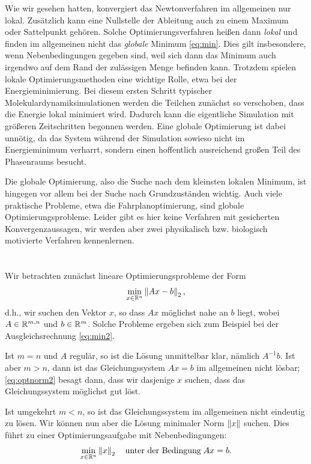 Wie wir gesehen hatten, konvergiert das Newtonverfahren im allgemeinen
nur lokal. Zusätzlich kann eine Nullstelle der Ableitung auch zu einem
Maximum oder Sattelpunkt gehören. Solche Optimierungsverfahren heißen
dann \emph{lokal} und finden im allgemeinen
nicht das \emph{globale} Minimum \eqref{eq:min}. Dies gilt
insbesondere, wenn Nebenbedingungen gegeben sind, weil sich dann das
Minimum auch irgendwo auf dem Rand der zulässigen Menge befinden
kann. Trotzdem spielen lokale Optimierungsmethoden eine wichtige
Rolle, etwa bei der Energieminimierung. Bei diesem ersten Schritt
typischer Molekulardynamiksimulationen werden die Teilchen zunächst so
verschoben, dass die Energie lokal minimiert wird. Dadurch kann die
eigentliche Simulation mit größeren Zeitschritten begonnen
werden. Eine globale Optimierung ist dabei unnötig, da das System
während der Simulation sowieso nicht im Energieminimum verharrt,
sondern einen hoffentlich ausreichend großen Teil des Phasenraums
besucht.

Die globale Optimierung, also die Suche
nach dem kleinsten lokalen Minimum, ist hingegen vor allem bei der
Suche nach Grundzuständen wichtig. Auch viele praktische Probleme,
etwa die Fahrplanoptimierung, sind globale
Optimierungsprobleme. Leider gibt es hier keine Verfahren mit
gesicherten Konvergenzaussagen, wir werden aber zwei physikalisch
bzw. biologisch motivierte Verfahren kennenlernen.

\section{}

Wir betrachten zunächst lineare Optimierungsprobleme der Form
\begin{equation}
  \label{eq:optnorm2}
  \min_{x\in\mathbb{R}^n} \left\lVert{Ax-b}\right\rVert_2,
\end{equation}
d.h., wir suchen den Vektor $x$, so dass $Ax$ möglichst nahe an $b$
liegt, wobei $A\in\mathbb{R}^{m,n}$ und $b\in\mathbb{R}^{m}$.  Solche Probleme
ergeben sich zum Beispiel bei der Ausgleichsrechnung
\eqref{eq:min2}.

Ist $m = n$ und $A$ regulär, so ist die Lösung unmittelbar klar,
nämlich $A^{-1}b$. Ist aber $m>n$, dann ist das Gleichungssystem
$Ax=b$ im allgemeinen nicht lösbar; \eqref{eq:optnorm2} besagt dann,
dass wir dasjenige $x$ suchen, dass das Gleichungssystem möglichst gut
löst.

Ist umgekehrt $m < n$, so ist das Gleichungssystem im allgemeinen
nicht eindeutig zu lösen. Wir können nun aber die Lösung minimaler
Norm $\left\lVert{x}\right\rVert$ suchen. Dies führt zu einer Optimierungsaufgabe mit
Nebenbedingungen:
\begin{equation}
  \label{eq:optnorm2bild}
  \min_{x\in\mathbb{R}^n} \left\lVert{x}\right\rVert_2\quad\text{unter der Bedingung}\; Ax=b.
\end{equation}

